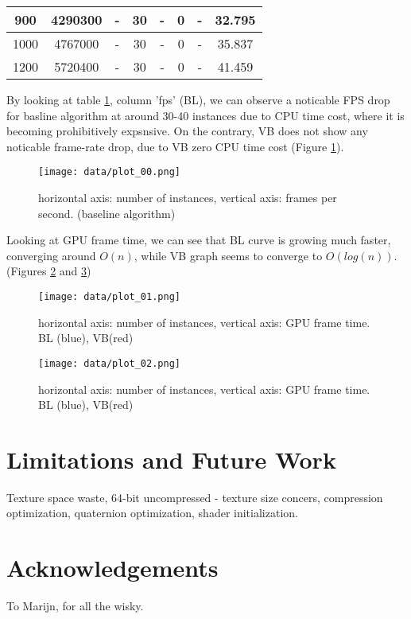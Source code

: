 \documentclass{acmsiggraph}
\begin{document}
\begin{table}[h]
\begin{tabular}{|c|c|c|c|c|c|c|c|}
    \hline
                    900& 4290300                & -  & 30                  & -     & 0                                     & -     & 32.795                             \\
    \hline
                   1000& 4767000                & -  & 30                  & -     & 0                                     & -     & 35.837                             \\
    \hline
                   1200& 5720400                & -  & 30                  & -     & 0                                     & -     & 41.459                             \\
    \hline    
  \end{tabular}
  \label{performance}
\end{table}
  
By looking at  table \ref{performance}, column 'fps' (BL), we can observe a noticable FPS drop for basline algorithm at around 30-40 instances due to CPU time cost, where it is becoming prohibitively expsnsive.  On the contrary, VB does not show any noticable frame-rate drop, due to VB zero CPU time cost (Figure \ref{framerate_drop}).

\begin{figure}[H]
  \centering
  \texttt{[image: data/plot\_00.png]}
  \caption{horizontal axis: number of instances, vertical axis: frames per second. (baseline algorithm)}
  \label{framerate_drop}
\end{figure}

Looking at GPU frame time, we can see that BL curve is growing much faster, converging around \(O(n)\), while VB graph seems to converge to \(O(log (n))\). (Figures \ref{graph_growth} and \ref{graph_growth_1200})

\begin{figure}[H]
  \centering
  \texttt{[image: data/plot\_01.png]}
  \caption{horizontal axis: number of instances, vertical axis: GPU frame time. BL (blue), VB(red)}
  \label{graph_growth}
\end{figure}

\begin{figure}[ht]
  \centering
  \texttt{[image: data/plot\_02.png]}
  \caption{horizontal axis: number of instances, vertical axis: GPU frame time. BL (blue), VB(red)}
  \label{graph_growth_1200}
\end{figure}

\section{Limitations and Future Work}

Texture space waste, 64-bit uncompressed - texture size concers, compression optimization, quaternion optimization, shader initialization.

\section*{Acknowledgements}

To Marijn, for all the wisky.


\nocite{*}

\end{document}
